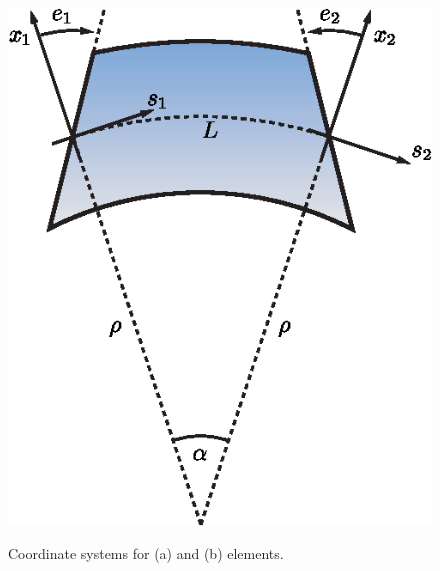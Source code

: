 \begin{figure}[tb]
  {\includegraphics{sbend-coords.eps}}
  \caption{Coordinate systems for (a)  and (b)  elements.}
  \label{f:bend}
\end{figure}

